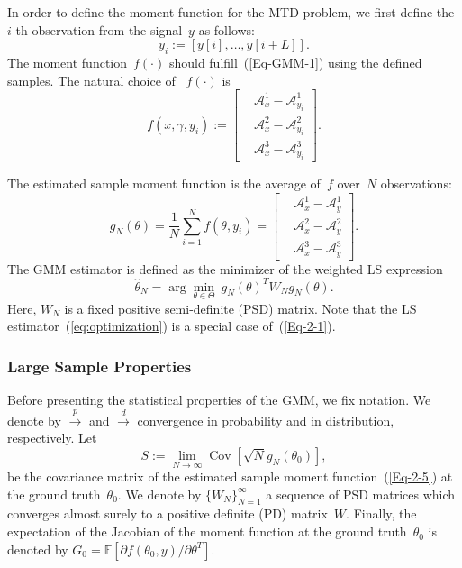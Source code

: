 \documentclass{article}
\newcommand{\A}[0]{\mathcal{A}}
\newcommand{\E}[0]{\mathbb{E}}
\newcommand{\Cov}[0]{\operatorname{Cov}}
\begin{document}
In order to define the moment function for the MTD problem, we first define the $i$-th observation from the signal~$y$ as follows:
\begin{equation}
	y_i := [y[i],\ldots, y[i+L]].
\end{equation}
The moment function~$f(\cdot)$ should fulfill~(\ref{Eq-GMM-1}) using the defined samples. The natural choice of ~$f(\cdot)$ is
\begin{equation} \label{Eq-GMM-2}
	f(x,\gamma,y_i) :=
	\begin{bmatrix}
		&\A_x^1 - \A_{y_i}^1\\
		&\A_x^2 - \A_{y_i}^2 \\
		&\A_x^3 - \A_{y_i}^3
	\end{bmatrix}.
\end{equation}

The estimated sample moment function is the average of~$f$ over~$N$ observations:
\begin{equation}\label{Eq-2-5}
	g_N(\theta) = \frac{1}{N} \sum_{i=1}^N f(\theta, y_i) = \begin{bmatrix}
		&\A_x^1 - \A_{y}^1\\
		&\A_x^2 - \A_{y}^2 \\
		&\A_x^3 - \A_{y}^3
	\end{bmatrix}.
\end{equation}
The GMM estimator is defined as the minimizer of the weighted LS expression
\begin{equation} \label{Eq-2-1}
	\hat{\theta}_N = \arg\min_{\theta \in \Theta} \ g_N(\theta)^T W_N g_N(\theta).
\end{equation}
Here, $W_N$ is a fixed positive semi-definite (PSD) matrix. Note that the LS estimator~(\ref{eq:optimization}) is a special case of~(\ref{Eq-2-1}).

\subsubsection{Large Sample Properties}\label{gmm:large}

Before presenting the statistical properties of the GMM, we fix notation. We denote by $\overset{p}{\to}$ and $\overset{d}{\to}$ convergence in  probability and in distribution, respectively. Let
\begin{equation} \label{eqn:cov_mat_S}
	S := \lim_{N\to \infty}\Cov\left[\sqrt{N}g_N(\theta_0)\right],
\end{equation}
be the covariance matrix of the estimated sample moment function~(\ref{Eq-2-5}) at the ground truth~$\theta_0$. We denote by $\{W_N\}_{N=1}^\infty$ a sequence of PSD matrices which converges almost surely to a positive definite (PD) matrix~$W$. Finally, the expectation of the Jacobian of the moment function at the ground truth~$\theta_0$ is denoted by $G_0 = \E\left[\partial f(\theta_0, y) / \partial \theta^T\right]$.
\end{document}
